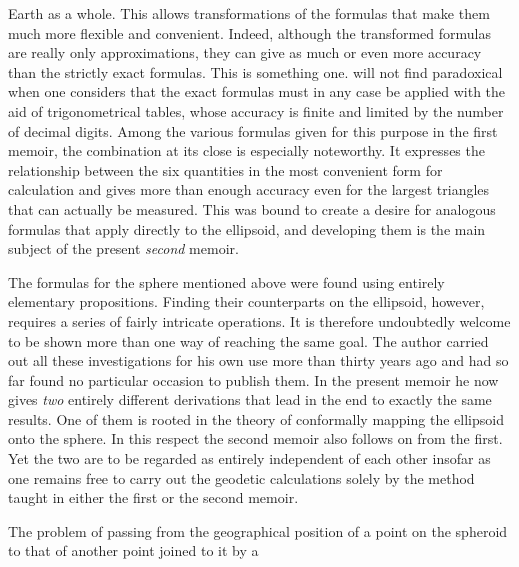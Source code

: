 %
Earth as a whole. This allows transformations of the formulas that make them much more flexible and convenient. Indeed, although the transformed formulas are really only approximations, they can give as much or even more accuracy than the strictly exact formulas. This is something one. will not find paradoxical when one considers that the exact formulas must in any case be applied with the aid of trigonometrical tables, whose accuracy is finite and limited by the number of decimal digits. Among the various formulas given for this purpose in the first memoir, the combination at its close is especially noteworthy. It expresses the relationship between the six quantities in the most convenient form for calculation and gives more than enough accuracy even for the largest triangles that can actually be measured. This was bound to create a desire for analogous formulas that apply directly to the ellipsoid, and developing them is the main subject of the present \textit{second} memoir.

The formulas for the sphere mentioned above were found using entirely elementary propositions. Finding their counterparts on the ellipsoid, however, requires a series of fairly intricate operations. It is therefore undoubtedly welcome to be shown more than one way of reaching the same goal. The author carried out all these investigations for his own use more than thirty years ago and had so far found no particular occasion to publish them. In the present memoir he now gives \textit{two} entirely different derivations that lead in the end to exactly the same results. One of them is rooted in the theory of conformally mapping the ellipsoid onto the sphere. In this respect the second memoir also follows on from the first. Yet the two are to be regarded as entirely independent of each other insofar as one remains free to carry out the geodetic calculations solely by the method taught in either the first or the second memoir.

The problem of passing from the geographical position of a point on the spheroid to that of another point joined to it by a %
